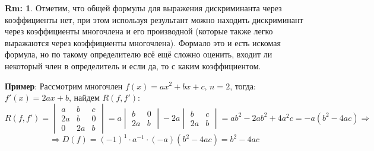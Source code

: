\documentclass[12pt]{article}
\theoremstyle{definition}
\newtheorem{rem}{Rm:}
\begin{document}
\begin{rem}
	Отметим, что общей формулы для выражения дискриминанта через коэффициенты нет, при этом используя результант можно находить дискриминант через коэффициенты многочлена и его производной (которые также легко выражаются через коэффициенты многочлена). Формало это и есть искомая формула, но по такому определителю всё ещё сложно оценить, входит ли некоторый член в определитель и если да, то с каким коэффициентом.
\end{rem}
\textbf{Пример}: Рассмотрим многочлен $f(x) = ax^2 + bx + c, \, n = 2$, тогда: $f'(x) = 2ax + b$, найдем $R(f,f')$:
$$
	 R(f,f') = 
	\begin{vmatrix}
		a & b & c\\
		2a & b & 0\\
		0& 2a & b
	\end{vmatrix} = a
	\begin{vmatrix}
		b & 0 \\
		2a & b
	\end{vmatrix} - 2a
	\begin{vmatrix}
		b & c \\
		2a & b
	\end{vmatrix} = ab^2 -2ab^2 + 4a^2c = - a(b^2 - 4ac) \Rightarrow
$$
$$
	\Rightarrow D(f) = (-1)^{1}{\cdot}a^{-1}{\cdot}(-a)(b^2 - 4ac) = b^2 - 4ac
$$
\end{document}
